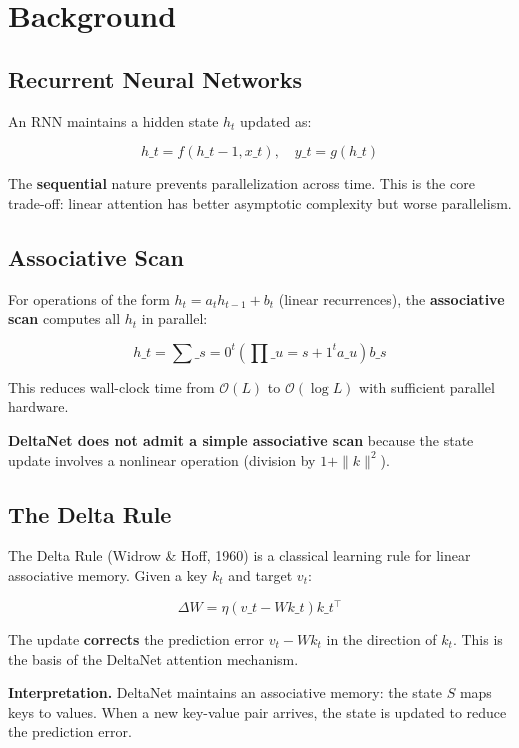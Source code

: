 
\section{Background}

\subsection{Recurrent Neural Networks}

An RNN maintains a hidden state $h_t$ updated as:

\[
h\_t = f(h\_{t-1}, x\_t), \quad y\_t = g(h\_t)
\tag{3.1}
\]

The \textbf{sequential} nature prevents parallelization across time. This is the 
core trade-off: linear attention has better asymptotic complexity but worse 
parallelism.

\subsection{Associative Scan}

For operations of the form $h_t = a_t h_{t-1} + b_t$ (linear recurrences), 
the \textbf{associative scan} computes all $h_t$ in parallel:

\[
h\_t = \sum\_{s=0}^{t} \left(\prod\_{u=s+1}^{t} a\_u\right) b\_s
\tag{3.2}
\]

This reduces wall-clock time from $\mathcal{O}(L)$ to $\mathcal{O}(\log L)$ 
with sufficient parallel hardware.

\textbf{DeltaNet does not admit a simple associative scan} because the state 
update involves a nonlinear operation (division by $1 + \|k\|^2$).

\subsection{The Delta Rule}

The Delta Rule (Widrow \& Hoff, 1960) is a classical learning rule for linear 
associative memory. Given a key $k_t$ and target $v_t$:

\[
\Delta W = \eta (v\_t - W k\_t) k\_t^\top
\tag{3.3}
\]

The update \textbf{corrects} the prediction error $v_t - W k_t$ in the direction 
of $k_t$. This is the basis of the DeltaNet attention mechanism.

\textbf{Interpretation.} DeltaNet maintains an associative memory: the state $S$ 
maps keys to values. When a new key-value pair arrives, the state is updated 
to reduce the prediction error.

